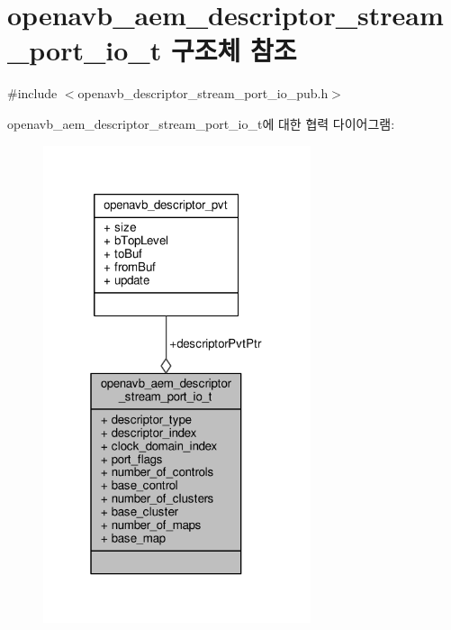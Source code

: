 \hypertarget{structopenavb__aem__descriptor__stream__port__io__t}{}\section{openavb\+\_\+aem\+\_\+descriptor\+\_\+stream\+\_\+port\+\_\+io\+\_\+t 구조체 참조}
\label{structopenavb__aem__descriptor__stream__port__io__t}


{\ttfamily \#include $<$openavb\+\_\+descriptor\+\_\+stream\+\_\+port\+\_\+io\+\_\+pub.\+h$>$}



openavb\+\_\+aem\+\_\+descriptor\+\_\+stream\+\_\+port\+\_\+io\+\_\+t에 대한 협력 다이어그램\+:
\nopagebreak
\begin{figure}[H]
\begin{center}
\leavevmode
\includegraphics[width=223pt]{structopenavb__aem__descriptor__stream__port__io__t__coll__graph}
\end{center}
\end{figure}
